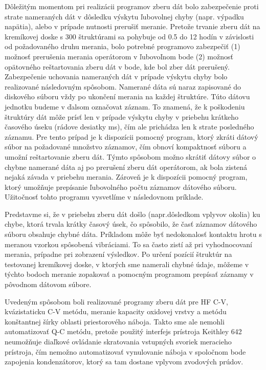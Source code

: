 Dôležitým momentom pri realizácii programov zberu dát bolo
zabezpečenie proti strate nameraných dát v dôsledku výskytu ľubovolnej
chyby (napr. výpadku napätia), alebo v prípade nutnosti prerušiť
meranie. Pretože trvanie zberu dát na kremíkovej doske s 300
štruktúrami sa pohybuje od 0.5 do 12 hodín v závislosti od
požadovaného druhu merania, bolo potrebné programovo zabezpečiť (1)
možnosť prerušenia merania operátorom v ľubovoľnom bode (2) možnosť
opätovného reštartovania zberu dát v bode, kde bol zber dát
prerušený. Zabezpečenie uchovania nameraných dát v prípade výskytu
chyby bolo realizované následovným spôsobom. Namerané dáta sú naraz
zapisované do diskového súboru vždy po ukončení merania na každej
štruktúre. Túto dátovu jednotku budeme v ďalsom označovat záznam. To
znamená, že k poškodeniu štruktúry dát môže prísť len v prípade
výskytu chyby v priebehu krátkeho časového úseku (rádove desiatky ms),
čím ale prichádza len k strate posledného záznamu. Pre tento prípad je
k dispozícii pomocný program, ktorý zkráti dátový súbor na požadované
množstvo záznamov, čím obnoví kompaktnosť súboru a umožní
reštartovanie zberu dát. Týmto spôsobom možno skrátiť dátovy súbor o
chybne namerané dáta aj po prerušení zberu dát operátorom, ak bola
zistená nejaká závada v priebehu merania. Zároveň je k dispozícii
pomocný program, ktorý umožňuje prepísanie ľubovolného počtu záznamov
dátového súboru. Užitočnosť tohto programu vysvetlíme v následovnom
príklade.

Predstavme si, že v priebehu zberu dát došlo (napr.dôsledkom vplyvov
okolia) ku chybe, ktorá trvala krátky časový úsek, čo spôsobilo, že
časť záznamov dátového súboru obsahuje chybné dáta. Príkladom môže byť
nedokonalosť kontaktu hrotu s meranou vzorkou spôsobená vibráciami. To
sa často zistí až pri vyhodnocovaní merania, prípadne pri zobrazení
výsledkov. Po určení pozícií štruktúr na testovanej kremíkovej doske,
v ktorých sme namerali chybné údaje, môžeme v týchto bodoch meranie
zopakovať a pomocným programom prepísať záznamy v pôvodnom dátovom
súbore.

Uvedeným spôsobom boli realizované programy zberu dát pre HF C-V,
kvázistaticku C-V metódu, meranie kapacity oxidovej vrstvy a metódu
konštantnej šírky oblasti priestorového náboja. Takto sme ale nemohli
automatizovať Q-C metódu, pretože použitý interfejs prístroja Keithley
642 neumožňuje diaľkové ovládanie skratovania vstupných svoriek
meracieho prístroja, čím nemožno automatizovať vynulovanie náboja v
spoločnom bode zapojenia kondenzátorov, ktorý sa tam dostane vplyvom
zvodových prúdov.

